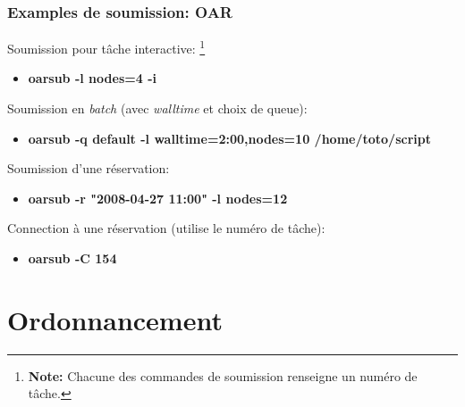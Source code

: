 \documentclass{beamer}
\begin{document}

\begin{frame}
	\frametitle{Examples de soumission: OAR}
	
Soumission pour tâche interactive: \footnote{{\bf Note:} Chacune des commandes de soumission renseigne un numéro de tâche.}

		\begin{itemize}
			\item	{\bf oarsub -l nodes=4 -i}
		\end{itemize}

	Soumission en {\em batch} (avec {\em walltime} et choix de queue):
		\begin{itemize}
			\item	{\bf oarsub -q default -l walltime=2:00,nodes=10 /home/toto/script}
		\end{itemize}

	Soumission d'une réservation:
		\begin{itemize}
			\item	{\bf oarsub -r "2008-04-27 11:00" -l nodes=12}
		\end{itemize}

	Connection à une réservation (utilise le numéro de tâche):
		\begin{itemize}
			\item	{\bf oarsub -C 154}
		\end{itemize}


\end{frame}

\section{Ordonnancement}
\end{document}
